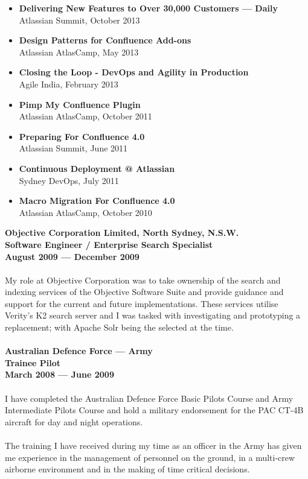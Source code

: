 \documentclass[a4paper]{article}
\begin{document}
\begin{itemize}
\item \textbf{Delivering New Features to Over 30,000 Customers --- Daily}\\Atlassian Summit, October 2013
\item \textbf{Design Patterns for Confluence Add-ons}\\Atlassian AtlasCamp, May 2013
\item \textbf{Closing the Loop - DevOps and Agility in Production}\\Agile India, February 2013
\item \textbf{Pimp My Confluence Plugin}\\Atlassian AtlasCamp, October 2011
\item \textbf{Preparing For Confluence 4.0}\\Atlassian Summit, June 2011
\item \textbf{Continuous Deployment @ Atlassian}\\Sydney DevOps, July 2011
\item \textbf{Macro Migration For Confluence 4.0}\\Atlassian AtlasCamp, October 2010
\end{itemize}
\textbf{Objective Corporation Limited, North Sydney, N.S.W.\\Software Engineer / Enterprise Search Specialist\\August 2009 --- December 2009}\\\\
My role at Objective Corporation was to take ownership of the search and indexing services of the Objective Software Suite and provide guidance and support for the current and future implementations. These services utilise Verity's K2 search server and I was tasked with investigating and prototyping a replacement; with Apache Solr being the selected at the time.\\\\
\textbf{Australian Defence Force --- Army\\Trainee Pilot\\March 2008 --- June 2009}\\\\
I have completed the Australian Defence Force Basic Pilots Course and Army Intermediate Pilots Course and hold a military endorsement for the PAC CT-4B aircraft for day and night operations.\\\\
The training I have received during my time as an officer in the Army has given me experience in the management of personnel on the ground, in a multi-crew airborne environment and in the making of time critical decisions.\\\\
\end{document}
